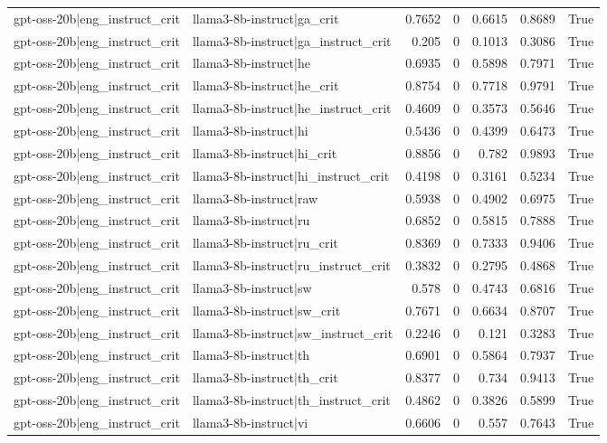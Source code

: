 \begin{table}
\begin{tabular}{l l r r r r l}
gpt-oss-20b|eng_instruct_crit & llama3-8b-instruct|ga_crit & 0.7652 & 0 & 0.6615 & 0.8689 & True \\
gpt-oss-20b|eng_instruct_crit & llama3-8b-instruct|ga_instruct_crit & 0.205 & 0 & 0.1013 & 0.3086 & True \\
gpt-oss-20b|eng_instruct_crit & llama3-8b-instruct|he & 0.6935 & 0 & 0.5898 & 0.7971 & True \\
gpt-oss-20b|eng_instruct_crit & llama3-8b-instruct|he_crit & 0.8754 & 0 & 0.7718 & 0.9791 & True \\
gpt-oss-20b|eng_instruct_crit & llama3-8b-instruct|he_instruct_crit & 0.4609 & 0 & 0.3573 & 0.5646 & True \\
gpt-oss-20b|eng_instruct_crit & llama3-8b-instruct|hi & 0.5436 & 0 & 0.4399 & 0.6473 & True \\
gpt-oss-20b|eng_instruct_crit & llama3-8b-instruct|hi_crit & 0.8856 & 0 & 0.782 & 0.9893 & True \\
gpt-oss-20b|eng_instruct_crit & llama3-8b-instruct|hi_instruct_crit & 0.4198 & 0 & 0.3161 & 0.5234 & True \\
gpt-oss-20b|eng_instruct_crit & llama3-8b-instruct|raw & 0.5938 & 0 & 0.4902 & 0.6975 & True \\
gpt-oss-20b|eng_instruct_crit & llama3-8b-instruct|ru & 0.6852 & 0 & 0.5815 & 0.7888 & True \\
gpt-oss-20b|eng_instruct_crit & llama3-8b-instruct|ru_crit & 0.8369 & 0 & 0.7333 & 0.9406 & True \\
gpt-oss-20b|eng_instruct_crit & llama3-8b-instruct|ru_instruct_crit & 0.3832 & 0 & 0.2795 & 0.4868 & True \\
gpt-oss-20b|eng_instruct_crit & llama3-8b-instruct|sw & 0.578 & 0 & 0.4743 & 0.6816 & True \\
gpt-oss-20b|eng_instruct_crit & llama3-8b-instruct|sw_crit & 0.7671 & 0 & 0.6634 & 0.8707 & True \\
gpt-oss-20b|eng_instruct_crit & llama3-8b-instruct|sw_instruct_crit & 0.2246 & 0 & 0.121 & 0.3283 & True \\
gpt-oss-20b|eng_instruct_crit & llama3-8b-instruct|th & 0.6901 & 0 & 0.5864 & 0.7937 & True \\
gpt-oss-20b|eng_instruct_crit & llama3-8b-instruct|th_crit & 0.8377 & 0 & 0.734 & 0.9413 & True \\
gpt-oss-20b|eng_instruct_crit & llama3-8b-instruct|th_instruct_crit & 0.4862 & 0 & 0.3826 & 0.5899 & True \\
gpt-oss-20b|eng_instruct_crit & llama3-8b-instruct|vi & 0.6606 & 0 & 0.557 & 0.7643 & True \\

\end{tabular}
\end{table}
